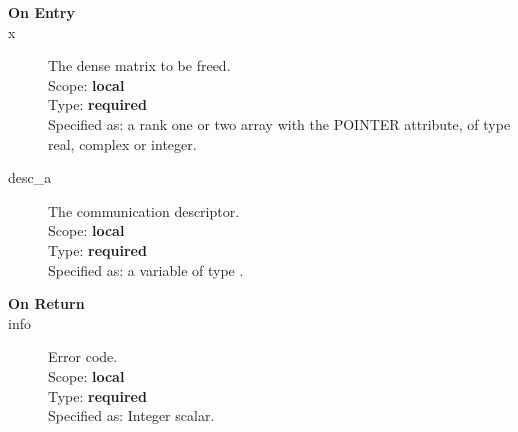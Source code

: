 
\begin{description}
\item[\bf On Entry]
\item[x] The dense matrix to
  be freed.\\
Scope: {\bf local} \\
Type: {\bf required}\\
Specified as: a rank one or two array with the POINTER
attribute, of type real, complex or integer.\\

\item[desc\_a] The communication descriptor.\\
Scope: {\bf local} \\
Type: {\bf required}\\
Specified as: a variable of type \descdata.\\
\end{description}

\begin{description}
\item[\bf On Return]
\item[info] Error code.\\
Scope: {\bf local} \\
Type: {\bf required}\\
Specified as: Integer scalar.\\
\end{description}


%
%


